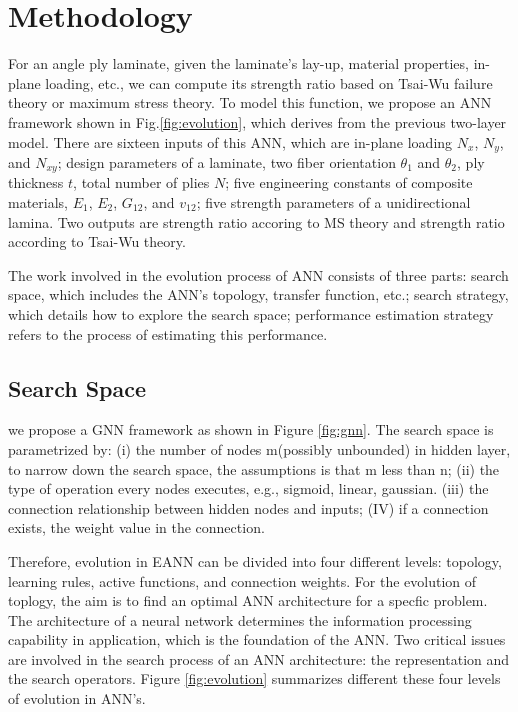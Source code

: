 \section{Methodology}
For an angle ply laminate, given the laminate's lay-up, material properties,
in-plane loading, etc., we can compute its strength ratio based on Tsai-Wu
failure theory or maximum stress theory. To model this function, we propose an
ANN framework shown in Fig.\ref{fig:evolution}, which derives from the previous
two-layer model. There are sixteen inputs of this ANN, which are in-plane
loading $N_x$, $N_y$, and $N_{xy}$; design parameters of a laminate, two 
fiber orientation $\theta_1$ and $\theta_2$, ply thickness $t$, total
number of plies $N$; 
five engineering constants of composite materials,
$E_1$, $E_2$, $G_{12}$, and $v_{12}$; five strength parameters of a
unidirectional lamina.  Two outputs are strength ratio accoring to MS theory
and strength ratio according to Tsai-Wu theory.


The work involved in the evolution process of ANN consists of three parts:
search space, which includes the ANN's topology, transfer function, etc.;
search strategy, which details how to explore the search space; performance
estimation strategy refers to the process of estimating this performance.

\subsection{Search Space}

we propose a GNN framework as shown in Figure \ref{fig:gnn}. The search space
is parametrized by: (i) the number of nodes m(possibly unbounded) in hidden
layer, to narrow down the search space, the assumptions is that m less than n; (ii) the type of
operation every nodes executes, e.g., sigmoid, linear, gaussian. (iii) the
connection relationship between hidden nodes and inputs; (IV) if a connection
exists, the weight value in the connection.

Therefore, evolution in EANN can be divided into four different levels: topology, learning
rules, active functions, and connection weights. For the evolution of toplogy,
the aim is to find an optimal ANN architecture for a specfic problem. The
architecture of a neural network determines the information processing
capability in application, which is the foundation of the ANN. Two critical
issues are involved in the search process of an ANN architecture: the
representation and the search operators.
Figure \ref{fig:evolution} summarizes different these four levels of evolution in ANN's.



